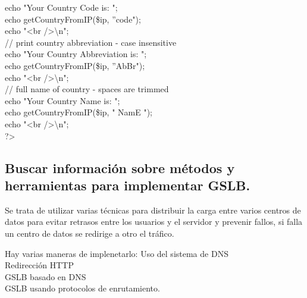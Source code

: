   echo "Your Country Code is: ";\\
  echo getCountryFromIP(\$ip, ''code");\\
  echo "<br />\textbackslash n";\\

  // print country abbreviation - case insensitive\\
  echo "Your Country Abbreviation is: ";\\
  echo getCountryFromIP(\$ip, ''AbBr");\\
  echo "<br />\textbackslash n";\\

  // full name of country - spaces are trimmed\\
  echo "Your Country Name is: ";\\
  echo getCountryFromIP(\$ip, " NamE ");\\
  echo "<br />\textbackslash n";\\

?>\\

\subsection{ Buscar información sobre métodos y herramientas para implementar GSLB. }

Se trata de utilizar varias técnicas para distribuir la carga entre varios centros de datos para evitar retrasos entre los usuarios y el servidor y prevenir fallos, si falla un centro de datos se redirige a otro el tráfico.

Hay varias maneras de implenetarlo:
Uso del sistema de DNS\\
Redirección HTTP\\
GSLB basado en DNS\\
GSLB usando protocolos de enrutamiento.\\




